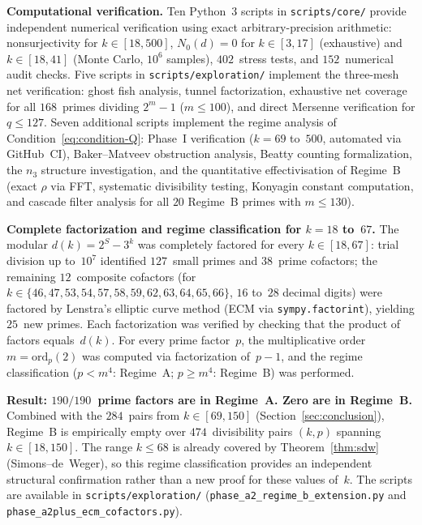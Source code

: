 \documentclass[12pt, a4paper]{amsart}
\theoremstyle{plain}
\theoremstyle{definition}
\theoremstyle{remark}
\newcommand{\ord}{\mathrm{ord}}
\begin{document}
\medskip\noindent
\textbf{Computational verification.}
Ten Python~3 scripts in \texttt{scripts/core/} provide independent
numerical verification using exact arbitrary-precision arithmetic:
nonsurjectivity for $k \in [18, 500]$,
$N_0(d) = 0$ for $k \in [3, 17]$ (exhaustive) and
$k \in [18, 41]$ (Monte Carlo, $10^6$ samples),
$402$~stress tests, and $152$~numerical audit checks.
Five scripts in \texttt{scripts/exploration/} implement
the three-mesh net verification: ghost fish analysis, tunnel
factorization, exhaustive net coverage for all
$168$~primes dividing $2^m - 1$ ($m \leq 100$), and direct
Mersenne verification for $q \leq 127$.
Seven additional scripts implement the regime analysis of
Condition~\eqref{eq:condition-Q}: Phase~I verification
($k = 69$ to~$500$, automated via GitHub~CI), Baker--Matveev
obstruction analysis, Beatty counting formalization, the
$n_3$ structure investigation, and the quantitative
effectivisation of Regime~B (exact $\rho$ via FFT,
systematic divisibility testing, Konyagin constant
computation, and cascade filter analysis for all $20$
Regime~B primes with $m \leq 130$).

\medskip\noindent
\textbf{Complete factorization and regime classification for
$k = 18$ to~$67$.}
The modular $d(k) = 2^S - 3^k$ was completely factored for
every $k \in [18, 67]$: trial division up to~$10^7$ identified
$127$~small primes and $38$~prime cofactors; the remaining
$12$~composite cofactors (for
$k \in \{46, 47, 53, 54, 57, 58, 59, 62, 63, 64, 65, 66\}$,
$16$ to~$28$ decimal digits) were factored by Lenstra's
elliptic curve method (ECM via \texttt{sympy.factorint}),
yielding $25$~new primes.
Each factorization was verified by checking that the product
of factors equals~$d(k)$.
For every prime factor~$p$, the multiplicative order
$m = \ord_p(2)$ was computed via factorization of~$p - 1$,
and the regime classification ($p < m^4$: Regime~A;
$p \geq m^4$: Regime~B) was performed.

\textbf{Result: $190/190$~prime factors are in Regime~A.
Zero are in Regime~B.}
Combined with the $284$~pairs from $k \in [69, 150]$
(Section~\ref{sec:conclusion}), Regime~B is empirically empty
over $474$~divisibility pairs $(k, p)$ spanning
$k \in [18, 150]$.
The range $k \leq 68$ is already covered by
Theorem~\ref{thm:sdw} (Simons--de~Weger),
so this regime classification provides an independent
structural confirmation rather than a new proof for these
values of~$k$.
The scripts are available in \texttt{scripts/exploration/}
(\texttt{phase\_a2\_regime\_b\_extension.py} and
\texttt{phase\_a2plus\_ecm\_cofactors.py}).
\end{document}
